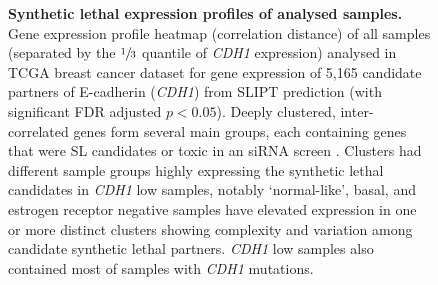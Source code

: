 \begin{figure}[!ht]
\begin{mdframed}
  \centering
    \caption[Synthetic lethal expression profiles of analysed samples]{\small \textbf{Synthetic lethal expression profiles of analysed samples.} Gene expression profile heatmap (correlation distance) of all samples (separated by the $\sfrac{1}{3}$ quantile of \textit{CDH1} expression) analysed in TCGA breast cancer dataset for gene expression of 5,165 candidate partners of E-cadherin (\textit{CDH1}) from \gls{SLIPT} prediction (with significant FDR adjusted $p < 0.05$). Deeply clustered, inter-correlated genes form several main groups, each containing genes that were SL candidates or toxic in an \gls{siRNA} screen \cite{Telford2015}. Clusters had different sample groups highly expressing the synthetic lethal candidates in \textit{CDH1} low samples, notably `normal-like', basal, and estrogen receptor negative samples have elevated expression in one or more distinct clusters showing complexity and variation among candidate synthetic lethal partners. \textit{CDH1} low samples also contained most of samples with \textit{CDH1} mutations.
}
\label{fig:slipt_expr}
\end{mdframed}
\end{figure}

